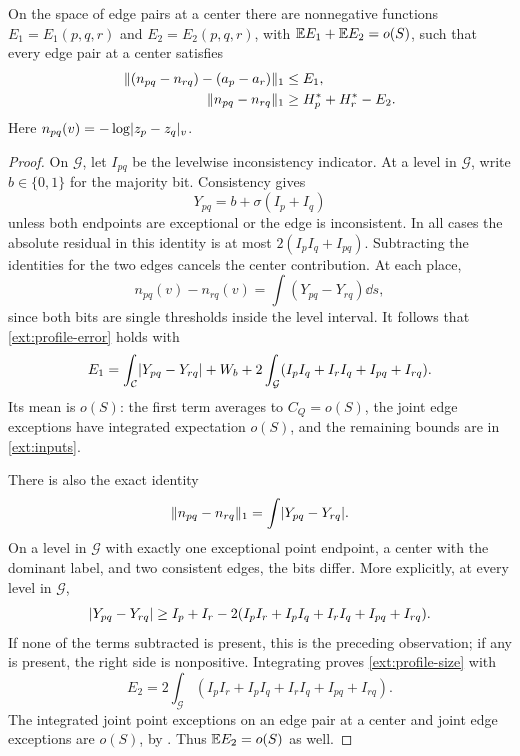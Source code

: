 \begin{lemma}\label{ext:profiles}
On the space of edge pairs at a center there are nonnegative functions
\(E_1=E_1(p,q,r)\) and \(E_2=E_2(p,q,r)\), with
\(\mathbb E E_1+\mathbb E E_2=o(S)\), such that every edge pair at a center satisfies
\begin{align}
 \lVert (n_{pq}-n_{rq})-(a_p-a_r)\rVert_1&\le E_1,
                                      \label{ext:profile-error}\\
 \lVert n_{pq}-n_{rq}\rVert_1&\ge H_p^*+H_r^*-E_2.
                                      \label{ext:profile-size}
\end{align}
Here \(n_{pq}(v)=-\log\lvert z_p-z_q\rvert_v\).
\end{lemma}

\begin{proof}
On \(\mathcal G\), let \(I_{pq}\) be
the levelwise inconsistency indicator.  At a level in \(\mathcal G\),
write \(b\in\{0,1\}\) for the majority bit.  Consistency gives
\[
 Y_{pq}=b+\sigma(I_p+I_q)
\]
unless both endpoints are exceptional or the edge is inconsistent.
In all cases the absolute residual in this identity is at most
\(2(I_pI_q+I_{pq})\).  Subtracting the identities for the two edges
cancels the center contribution.  At each place,
\[
 n_{pq}(v)-n_{rq}(v)=\int(Y_{pq}-Y_{rq})\dd s,
\]
since both bits are single thresholds inside the level interval.
It follows that \eqref{ext:profile-error} holds with
\[
 E_1=\int_{\mathcal C}\lvert Y_{pq}-Y_{rq}\rvert+W_b
       +2\int_{\mathcal G}(I_pI_q+I_rI_q+I_{pq}+I_{rq}).
\]
Its mean is \(o(S)\): the first term averages to \(C_Q=o(S)\), the
joint edge exceptions have integrated expectation \(o(S)\), and the
remaining bounds are in \eqref{ext:inputs}.

There is also the exact identity
\[
 \lVert n_{pq}-n_{rq}\rVert_1=\int\lvert Y_{pq}-Y_{rq}\rvert.
\]
On a level in $\mathcal G$ with exactly one exceptional point endpoint, a
center with the dominant label, and two consistent edges, the bits differ.  More
explicitly, at every level in $\mathcal G$,
\[
 \lvert Y_{pq}-Y_{rq}\rvert\ge I_p+I_r
 -2(I_pI_r+I_pI_q+I_rI_q+I_{pq}+I_{rq}).
\]
If none of the terms subtracted is present, this is the preceding
observation; if any is present, the right side is nonpositive.
Integrating proves \eqref{ext:profile-size} with
\[
 E_2=2\int_{\mathcal G}
                   (I_pI_r+I_pI_q+I_rI_q+I_{pq}+I_{rq}).
\]
The integrated joint point exceptions on an edge pair at a center and joint edge
exceptions are \(o(S)\), by .
Thus \(\mathbb E E_2=o(S)\) as well.
\end{proof}

